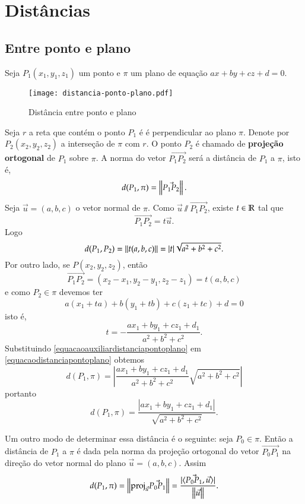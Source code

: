 

\section{Dist\^ancias} %
\label{sec:distancias}
\subsection{Entre ponto e plano} %
\label{sub:entre_ponto_e_plano}
Seja $P_1(x_1,y_1,z_1)$ um ponto e $\pi$ um plano de equa\c{c}\~ao $ax + by + cz + d = 0$.
\begin{figure}[!h]
    \centering
    \caption{Dist\^ancia entre ponto e plano}
    \texttt{[image: distancia-ponto-plano.pdf]}
\end{figure}
Seja $r$ a reta que cont\'em o ponto $P_1$ \'e \'e perpendicular ao plano $\pi$. Denote por $P_2(x_2,y_2,z_2)$ a interse\c{c}\~ao de $\pi$ com $r$. O ponto $P_2$ \'e chamado de \textbf{proje\c{c}\~ao ortogonal} de $P_1$ sobre $\pi$. A norma do vetor $\vec{P_1P_2}$ ser\'a a dist\^ancia de $P_1$ a $\pi$, isto \'e,
\[
    d(P_1,\pi) = \left\Vert{\vec{P_1P_2}}\right\Vert.
\]
Seja $\vec{u} = (a,b,c)$ o vetor normal de $\pi$. Como $\vec{u}\varparallel\vec{P_1P_2}$, existe $t \in \mathbb{R}$ tal que
\[
    \vec{P_1P_2} = t\vec{u}.
\]
Logo
\begin{equation}\label{equacaodistanciapontoplano}
    d(P_1,P_2) = \left\Vert{t(a,b,c)}\right\Vert = |t|\sqrt{a^2 + b^2 + c^2}.
\end{equation}
Por outro lado, se $P(x_2, y_2, z_2)$, ent\~ao
\[
    \vec{P_1P_2} = (x_2 - x_1, y_2 - y_1, z_2 - z_1) = t(a,b,c)
\]
e como $P_2 \in \pi$ devemos ter
\[
    a(x_1 + ta) + b(y_1 + tb) + c(z_1 + tc) + d = 0
\]
isto \'e,
\begin{equation}\label{equacaoauxiliardistanciapontoplano}
    t = -\dfrac{ax_1 + by_1 + cz_1 + d_1}{a^2 + b^2 + c^2}.
\end{equation}
Substituindo \eqref{equacaoauxiliardistanciapontoplano} em \eqref{equacaodistanciapontoplano} obtemos
\[
    d(P_1,\pi) = \left|\dfrac{ax_1 + by_1 + cz_1 + d_1}{a^2 + b^2 + c^2}\sqrt{a^2 + b^2 + c^2}\right|
\]
portanto
\[
    d(P_1,\pi) = \dfrac{|ax_1 + by_1 + cz_1 + d_1|}{\sqrt{a^2 + b^2 + c^2}}.
\]

Um outro modo de determinar essa dist\^ancia \'e o seguinte: seja $P_0 \in \pi$. Ent\~ao a dist\^ancia de $P_1$ a $\pi$ \'e dada pela norma da proje\c{c}\~ao ortogonal do vetor $\vec{P_0P_1}$ na dire\c{c}\~ao do vetor normal do plano $\vec{u} = (a,b,c)$. Assim
\[
    d(P_1,\pi) = \left\Vert{{\rm proj}_{\vec{u}}\vec{P_0P_1}}\right\Vert = \dfrac{|\langle\vec{P_0P_1},\vec{u}\rangle|}{\left\Vert{\vec{u}}\right\Vert}.
\]

